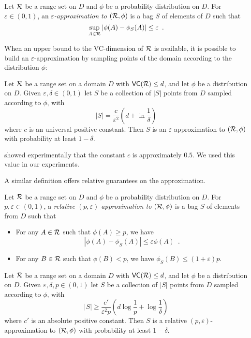 \begin{definition}\label{def:eapprox}
  Let $\mathcal{R}$ be a range set on %
  $D$ and $\phi$ be a probability distribution on $D$. For $\varepsilon\in(0,1)$,
  an \emph{$\varepsilon$-approximation to $(\mathcal{R},\phi)$} is a bag $S$ of
  elements of $D$ such that 
  \[
  \sup_{A\in\mathcal{R}}|\phi(A)-\phi_S(A)|\le\varepsilon\enspace.\]
\end{definition}

When an upper bound to the VC-dimension of $\mathcal{R}$ is available, it is possible
to build an $\varepsilon$-approximation by sampling points of
the domain according to the distribution $\phi$:

\begin{theorem}\label{thm:eapprox}
  Let $\mathcal{R}$ be a range set on a domain $D$ with
  $\mathsf{VC}(\mathcal{R})\le d$, and let $\phi$ be a distribution on $D$. Given
  $\varepsilon,\delta\in(0,1)$ let $S$ be a collection of $|S|$ points from $D$
  sampled according to $\phi$, with
  \begin{equation}\label{eq:vceapprox}
	|S|=\frac{c}{\varepsilon^2}\left(d+\ln\frac{1}{\delta}\right)
  \end{equation}
  where $c$ is an universal positive constant. Then $S$ is an
  $\varepsilon$-approximation to $(\mathcal{R},\phi)$ with probability at least
  $1-\delta$.
\end{theorem}
\citet{LofflerP09} showed experimentally that the constant $c$ is approximately
$0.5$. We used this value in our experiments.

A similar definition offers relative guarantees on the approximation.
\begin{definition}\label{def:releapprox}
  Let $\mathcal{R}$ be a range set on $D$ and $\phi$ be a probability distribution on
  $D$. For $p,\varepsilon\in (0,1)$, a \emph{relative
  $(p,\varepsilon)$-approximation to $(\mathcal{R},\phi)$} is a bag $S$ of elements
  from $D$ such that 
  \begin{itemize}
    \item For any $A\in\mathcal{R}$ such that $\phi(A)\ge p$, we have 
      \[ |\phi(A) - \phi_S(A)|\le \varepsilon\phi(A)\enspace.\]
    \item For any $B\in\mathcal{R}$ such that $\phi(B)< p$, we have $\phi_S(B)\le
      (1+\varepsilon)p$.
  \end{itemize}
\end{definition}

\begin{theorem}\label{thm:releapprox}
  Let $\mathcal{R}$ be a range set on a domain $D$ with
  $\mathsf{VC}(\mathcal{R})\le d$, and let $\phi$ be a distribution on $D$. Given
  $\varepsilon,\delta,p\in(0,1)$ let $S$ be a collection of $|S|$ points from $D$
  sampled according to $\phi$, with 
  \begin{equation}\label{eq:releapprox}
    |S|\ge\frac{c'}{\varepsilon^2p}\left(d\log\frac{1}{p}+\log\frac{1}{\delta}\right)
  \end{equation}
  where $c'$ is an absolute positive constant. Then $S$ is a relative
  $(p,\varepsilon)$-approximation to $(\mathcal{R},\phi)$ with probability at least
  $1-\delta$.
\end{theorem}

